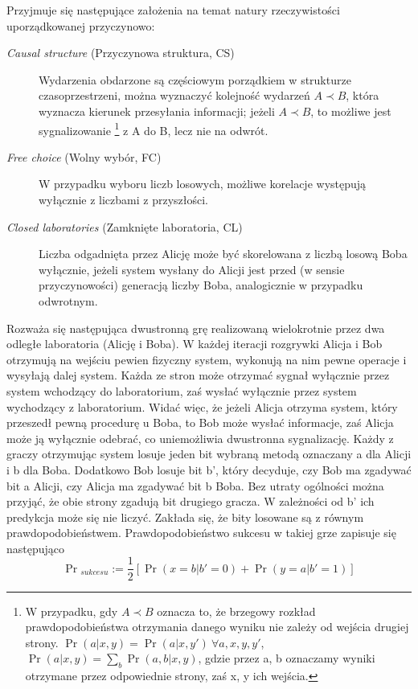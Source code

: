 \documentclass[10pt]{article} %
\begin{document}
Przyjmuje się następujące założenia na temat natury rzeczywistości uporządkowanej przyczynowo:
\begin{description}
	\item[\textit{Causal structure} (Przyczynowa struktura, CS)]
	Wydarzenia obdarzone są częściowym porządkiem w strukturze czasoprzestrzeni, można wyznaczyć kolejność wydarzeń $A \prec B$, która wyznacza kierunek przesyłania informacji; jeżeli $A \prec B$, to możliwe jest sygnalizowanie
	\footnote
	{W przypadku, gdy $A \prec B$ oznacza to, że brzegowy rozkład prawdopodobieństwa otrzymania danego wyniku nie zależy od wejścia drugiej strony. $\Pr(a|x, y) = \Pr(a|x, y')~\forall a,x,y,y'$, $\Pr(a|x,y) = \sum_b \Pr(a,b|x,y)$, gdzie przez a, b oznaczamy wyniki otrzymane przez odpowiednie strony, zaś x, y ich wejścia.} 
	z A do B, lecz nie na odwrót.
	\item[\textit{Free choice} (Wolny wybór, FC)]  
	W przypadku wyboru liczb losowych, możliwe korelacje występują wyłącznie z liczbami z przyszłości.
	\item[\textit{Closed laboratories} (Zamknięte laboratoria, CL)] 
	Liczba odgadnięta przez Alicję może być skorelowana z liczbą losową Boba wyłącznie, jeżeli system wysłany do Alicji jest przed (w sensie przyczynowości) generacją liczby Boba, analogicznie w przypadku odwrotnym.	
\end{description}
Rozważa się następująca dwustronną grę realizowaną wielokrotnie przez dwa odległe laboratoria (Alicję i Boba). W każdej iteracji rozgrywki Alicja i Bob otrzymują na wejściu pewien fizyczny system, wykonują na nim pewne operacje i wysyłają dalej system. Każda ze stron może otrzymać sygnał wyłącznie przez 
system wchodzący do laboratorium, zaś wysłać wyłącznie przez system wychodzący z laboratorium. Widać więc, że jeżeli Alicja otrzyma system, który przeszedł pewną procedurę u Boba, to Bob może wysłać informacje, zaś Alicja może ją wyłącznie odebrać, co uniemożliwia dwustronna sygnalizację.
Każdy z graczy otrzymując system losuje jeden bit wybraną metodą oznaczany a dla Alicji i b dla Boba. Dodatkowo Bob losuje bit b', który decyduje, czy Bob ma zgadywać bit a Alicji, czy Alicja ma zgadywać bit b Boba. Bez utraty ogólności można przyjąć, że obie strony zgadują bit drugiego gracza. W zależności od b' ich 
predykcja może się nie liczyć. Zakłada się, że bity losowane są z równym prawdopodobieństwem. Prawdopodobieństwo sukcesu w takiej grze zapisuje się następująco
\begin{equation}
\Pr{}_{sukcesu} := \frac{1}{2} \left[ \Pr(x=b|b'=0) + \Pr(y=a|b' = 1)\right]
\end{equation}
\end{document}
